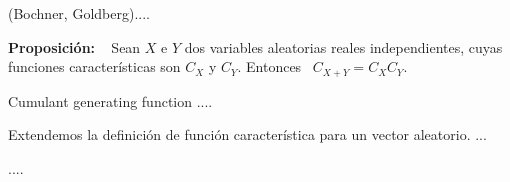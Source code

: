 {{\teorema (Bochner, Goldberg).... } %

\textbf{Proposici\'on:} \ %
Sean $X$ e  $Y$ dos variables aleatorias reales  independientes, cuyas funciones
caracter\'isticas son $C_X$ y $C_Y$. Entonces \ $C_{X+Y}=C_X C_Y$.

\hfill

Cumulant generating function .... %

\hfill

Extendemos  la  definici\'on  de   funci\'on  caracter\'istica  para  un  vector
aleatorio. ... %


....
}



